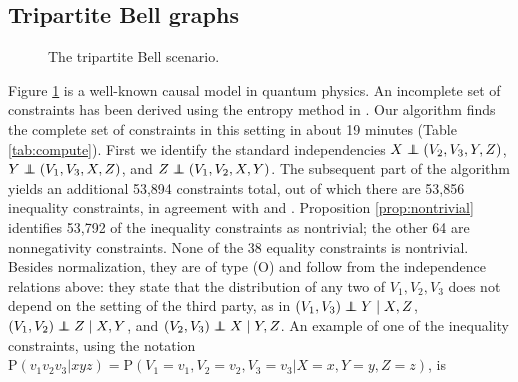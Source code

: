 \documentclass[12pt]{article}
\newcommand\indep{\protect\mathpalette{\protect\independenT}{\perp}}
\def\independenT#1#2{\mathrel{\rlap{$#1#2$}\mkern2mu{#1#2}}}
\def\Pr{{\mathrm{P}}}
\begin{document}
\subsection{Tripartite Bell graphs} \label{sec:tripart}

\begin{figure}[ht]
\begin{center}
\end{center}
\caption{The tripartite Bell scenario. \label{fig:tripart}}
\end{figure}

Figure \ref{fig:tripart} is a well-known causal model in quantum physics. An incomplete set of constraints has been derived using the entropy method in \citet{bell3}. Our algorithm finds the complete set of constraints in this setting in about 19 minutes (Table \ref{tab:compute}). First we identify the standard independencies $X \indep (V_2, V_3, Y, Z)$, $Y \indep (V_1, V_3, X, Z)$, and $Z \indep (V_1, V_2, X, Y)$. The subsequent part of the algorithm yields an additional 53,894 constraints total, out of which there are 53,856 inequality constraints, in agreement with \citet{Sliwa2003Symmetries} and \citet{Pironio_2011}. Proposition \ref{prop:nontrivial} identifies 53,792 of the inequality constraints as nontrivial; the other 64 are nonnegativity constraints. None of the 38 equality constraints is nontrivial. Besides normalization, they are of type (O) and follow from the independence relations above: they state that the distribution of any two of $V_1, V_2, V_3$ does not depend on the setting of the third party, as in $(V_1, V_3) \indep Y \mid X, Z$, $(V_1, V_2) \indep Z \mid X, Y$, and $(V_2, V_3) \indep X \mid Y, Z$. An example of one of the inequality constraints, using the notation $\Pr(v_1 v_2 v_3 | xyz) = \Pr(V_1 = v_1, V_2 = v_2, V_3 = v_3 | X = x, Y = y, Z = z)$, is
\end{document}
